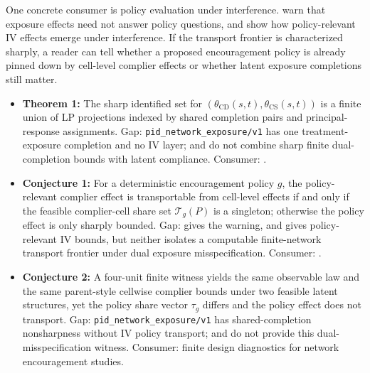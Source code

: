 \documentclass[11pt]{article}
\theoremstyle{definition}
\theoremstyle{plain}
\theoremstyle{remark}
\begin{document}
One concrete consumer is policy evaluation under interference. \citet{auerbach_auerbach_tabord_meehan_2024_exposure_policy_relevance} warn that exposure effects need not answer policy questions, and \citet{nibbering_oosterveen_2025_iv_interference_policy} show how policy-relevant IV effects emerge under interference. If the transport frontier is characterized sharply, a reader can tell whether a proposed encouragement policy is already pinned down by cell-level complier effects or whether latent exposure completions still matter.

\begin{itemize}[leftmargin=*]
\item \textbf{Theorem 1:} The sharp identified set for \((\theta_{\mathrm{CD}}(s,t),\theta_{\mathrm{CS}}(s,t))\) is a finite union of LP projections indexed by shared completion pairs and principal-response assignments. Gap: \texttt{pid\_network\_exposure/v1} has one treatment-exposure completion and no IV layer; \citet{hoshino_yanagi_2024_noncompliance_unknown_interference} and \citet{schroder_oprescu_feuerriegel_kallus_2026_networks_partialid} do not combine sharp finite dual-completion bounds with latent compliance. Consumer: \citet{imbens_manski_2004_ci_partial_id}.
\item \textbf{Conjecture 1:} For a deterministic encouragement policy \(g\), the policy-relevant complier effect is transportable from cell-level effects if and only if the feasible complier-cell share set \(\mathcal T_g(P)\) is a singleton; otherwise the policy effect is only sharply bounded. Gap: \citet{auerbach_auerbach_tabord_meehan_2024_exposure_policy_relevance} gives the warning, and \citet{nibbering_oosterveen_2025_iv_interference_policy} gives policy-relevant IV bounds, but neither isolates a computable finite-network transport frontier under dual exposure misspecification. Consumer: \citet{nibbering_oosterveen_2025_iv_interference_policy}.
\item \textbf{Conjecture 2:} A four-unit finite witness yields the same observable law and the same parent-style cellwise complier bounds under two feasible latent structures, yet the policy share vector \(\tau_g\) differs and the policy effect does not transport. Gap: \texttt{pid\_network\_exposure/v1} has shared-completion nonsharpness without IV policy transport; \citet{vazquez_bare_2023_iv_spillovers} and \citet{imai_jiang_malani_2021_interference_noncompliance} do not provide this dual-misspecification witness. Consumer: finite design diagnostics for network encouragement studies.
\end{itemize}
\end{document}
